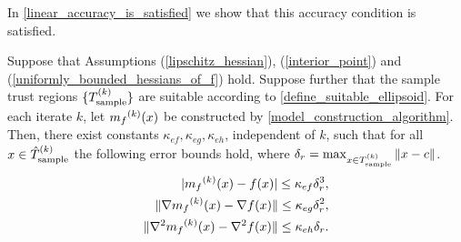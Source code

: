 \documentclass{article}
\let\oldref\ref
\renewcommand{\ref}[1]{(\oldref{#1})}
\begin{document}
In \cref{linear_accuracy_is_satisfied} we show that this accuracy condition is satisfied.

%
%
%
%


\begin{theorem}
\label{linear_accuracy_is_satisfied}

Suppose that Assumptions \ref{lipschitz_hessian},  \ref{interior_point} and  \ref{uniformly_bounded_hessians_of_f} hold.  
Suppose further that the sample trust regions $\{{T_{\text{sample}}^{(k)}}\}$ are suitable 
 according to \cref{define_suitable_ellipsoid}.    For each iterate $k$, let ${{m}_f}^{(k)}(x)$ be constructed by \cref{model_construction_algorithm}.    
Then,  there exist constants $\kappa_{ef}, \kappa_{eg}, \kappa_{eh}$, independent of $k$,  such that for all $x \in {\hat{T}_{\text{sample}}^{(k)}}$ the following error bounds hold, where $\delta_r = \max_{x \in {T_{\text{sample}}^{(k)}}} \|x - c\|$.
 \begin{align*}
|{{m}_f}^{(k)}(x) - f(x)| \le \kappa_{ef} \delta_r^3, \\
\|\nabla {{m}_f}^{(k)}(x) - \nabla  f(x)\| \le \kappa_{eg}\delta_r^2,  \\
\|\nabla^2 {{m}_f}^{(k)}(x) - \nabla^2  f(x)\| \le \kappa_{eh}\delta_r. 
\end{align*}


\end{theorem}
\end{document}
